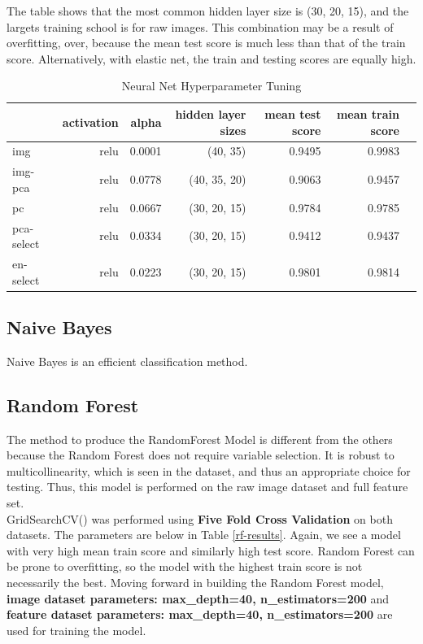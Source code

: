 \documentclass{article}
\begin{document}
The table shows that the most common hidden layer size is (30, 20, 15), and the largets training school is for raw images. This combination may be a result of overfitting, over, because the mean test score is much less than that of the train score. Alternatively, with elastic net, the train and testing scores are equally high.

\begin{table}[H]
    \centering
        \begin{tabular}{lrrrrrr}\toprule
        &activation &alpha &hidden layer sizes &mean test score &mean train score \\\midrule
        img &relu &0.0001 &(40, 35) &0.9495 &0.9983 \\
        img-pca &relu &0.0778 &(40, 35, 20) &0.9063 &0.9457 \\
        pc &relu &0.0667 &(30, 20, 15) &0.9784 &0.9785 \\
        pca-select &relu &0.0334 &(30, 20, 15) &0.9412 &0.9437 \\
        en-select &relu &0.0223 &(30, 20, 15) &0.9801 &0.9814 \\
        \bottomrule
        \end{tabular}
    \caption{Neural Net Hyperparameter Tuning}
    \label{nn-tune-table}
\end{table}

\subsection{Naive Bayes}

Naive Bayes is an efficient classification method.

\subsection{Random Forest} \label{rf}

The method to produce the RandomForest Model is different from the others because the Random Forest does not require variable selection. It is robust to multicollinearity, which is seen in the dataset, and thus an appropriate choice for testing. Thus, this model is performed on the raw image dataset and full feature set.\\

GridSearchCV() was performed using \textbf{Five Fold Cross Validation} on both datasets. The parameters are below in Table \ref{rf-results}. Again, we see a model with very high mean train score and similarly high test score. Random Forest can be prone to overfitting, so the model with the highest train score is not necessarily the best. Moving forward in building the Random Forest model, \textbf{image dataset parameters: max\_depth=40, n\_estimators=200} and \textbf{feature dataset parameters: max\_depth=40, n\_estimators=200} are used for training the model.
\end{document}

